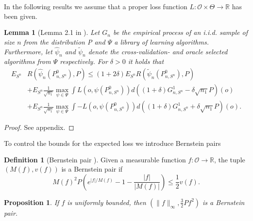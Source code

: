 \documentclass[11pt, a4paper]{article}
\newcommand\norm[1]{\lVert#1\rVert}
\newtheorem{proposition}[theorem]{Proposition}
\newtheorem{lemma}[theorem]{Lemma}
\theoremstyle{definition}
\newtheorem{definition}[theorem]{Definition}
\theoremstyle{remark}
\newcommand{\la}{\psi}
\newcommand{\Sn}{S^n}
\newcommand{\lib}{\Psi}
\begin{document}
In the following results we assume that a proper loss function $ L: \mathcal{O} \times \Theta \to \mathbb{R} $ has been given.  
\begin{lemma}[Lemma 2.1 in \parencite{vaart06}] \label{finitesampledecomp}
    Let $ G_{n} $ be the empirical process of an i.i.d. sample of size $ n $ from the distribution P and $ \lib$ a library of learning algorithms. Furthermore, let $ \hat{\la}_n  $ and $ \tilde{\la}_n $ denote the cross-validation- and oracle selected algorithms from $ \lib $ respectively. For $ \delta > 0 $ it holds that
   \begin{align*}
       E_{\Sn} &R( \hat{\la}_n(P_{n, \Sn}^{0}), P) \leq (1 + 2 \delta) E_{\Sn} R( \tilde{\la}_n(P_{n, \Sn}^{0}) , P ) \\ 
                                                                &+E_{\Sn} \frac{1}{\sqrt{n_1} } \max_{\la \in \lib} \int L(o, \la(P_{n, \Sn}^{0})) d ((1 + \delta) G_{n,\Sn}^{1} - \delta \sqrt{n_1} P)(o)  \\
                                                                &+E_{\Sn} \frac{1}{\sqrt{n_1} } \max_{\la \in \lib} \int-L(o, \la(P_{n, \Sn}^{0})) d ((1 + \delta) G_{n,\Sn}^{1} + \delta \sqrt{n_1} P)(o).
   \end{align*}
\end{lemma}
\begin{proof}
    See appendix.
\end{proof}
To control the bounds for the expected loss we introduce Bernstein pairs 
\begin{definition}[Bernstein pair \parencite{vaart06}]
    Given a measurable function $ f: \mathcal{O} \to \mathbb{R} $, the tuple $ (M(f) , v(f)) $ is a Bernstein pair if 
    \begin{equation} \label{bernstein}
        M(f)^2 P\left( e^{|f|/M(f)} -1 - \frac{|f|}{|M(f)|}\right) \leq \frac{1}{2}v(f). 
    \end{equation}
\end{definition}
\begin{proposition} \label{unifbernstein}
    If $ f $ is uniformly bounded, then $ (\norm{f}_{\infty}, \frac{3}{2} Pf^2 ) $ is a Bernstein pair. 
\end{proposition}
\end{document}
